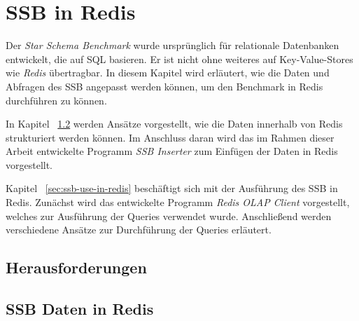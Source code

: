 \chapter{SSB in Redis}
Der \emph{Star Schema Benchmark} wurde ursprünglich für relationale Datenbanken entwickelt, die auf SQL basieren. Er ist nicht ohne weiteres auf Key-Value-Stores wie \emph{Redis} übertragbar. In diesem Kapitel wird erläutert, wie die Daten und Abfragen des SSB angepasst werden können, um den Benchmark in Redis durchführen zu können.

In Kapitel ~\ref{sec:ssb-data-in-redis} werden Ansätze vorgestellt, wie die Daten innerhalb von Redis strukturiert werden können. Im Anschluss daran wird das im Rahmen dieser Arbeit entwickelte Programm \emph{SSB Inserter} zum Einfügen der Daten in Redis vorgestellt.


Kapitel ~\ref{sec:ssb-use-in-redis} beschäftigt sich mit der Ausführung des SSB in Redis.
Zunächst wird das entwickelte Programm \emph{Redis OLAP Client} vorgestellt, welches zur Ausführung der Queries verwendet wurde. Anschließend werden verschiedene Ansätze zur Durchführung der Queries erläutert. %

\section{Herausforderungen}

\section{SSB Daten in Redis}\label{sec:ssb-data-in-redis}

